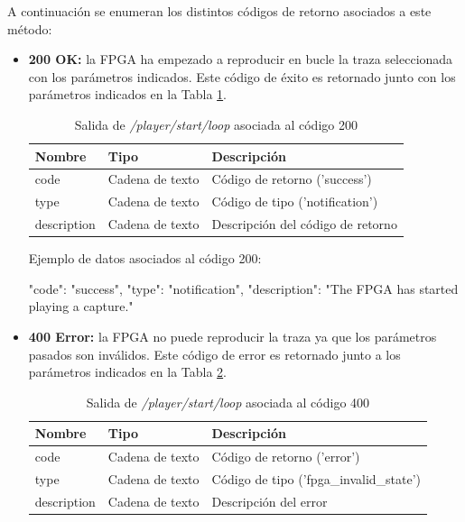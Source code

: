 A continuación se enumeran los distintos códigos de retorno asociados a este método:
\begin{itemize}

\item{\textbf{200 OK:} la \gls{FPGA} ha empezado a reproducir en bucle la \gls{traza} seleccionada con los parámetros indicados. Este código de éxito es retornado junto con los parámetros indicados en la Tabla \ref{extra:api:playerstartloop:ok}.
\begin{table}[H]
\centering
\begin{tabular}{|l|l|l|}
\hline
\rowcolor[HTML]{F5F5F5}
\textbf{Nombre}  & \textbf{Tipo}   & \textbf{Descripción}              \\ \hline
code             & Cadena de texto & Código de retorno ('success')     \\ \hline
type             & Cadena de texto & Código de tipo ('notification')   \\ \hline
description      & Cadena de texto & Descripción del código de retorno \\ \hline
\end{tabular}
\caption{Salida de \textit{/player/start/loop} asociada al código 200}
\label{extra:api:playerstartloop:ok}
\end{table}
\begin{minipage}{\textwidth}
Ejemplo de datos asociados al código 200:

\begin{code}[language=json]
{
  "code": "success",
  "type": "notification",
  "description": "The FPGA has started playing a capture."
}
\end{code}
\end{minipage}
}

\item{\textbf{400 Error:} la \gls{FPGA} no puede reproducir la \gls{traza} ya que los parámetros pasados son inválidos. Este código de error es retornado junto a los parámetros indicados en la Tabla \ref{extra:api:playerstartloop:error400}.
\begin{table}[H]
\centering
\begin{tabular}{|l|l|l|}
\hline
\rowcolor[HTML]{F5F5F5}
\textbf{Nombre}  & \textbf{Tipo}   & \textbf{Descripción}                    \\ \hline
code             & Cadena de texto & Código de retorno ('error')             \\ \hline
type             & Cadena de texto & Código de tipo ('fpga\_invalid\_state') \\ \hline
description      & Cadena de texto & Descripción del error                   \\ \hline
\end{tabular}
\caption{Salida de \textit{/player/start/loop} asociada al código 400}
\label{extra:api:playerstartloop:error400}
\end{table}

}
\end{itemize}
